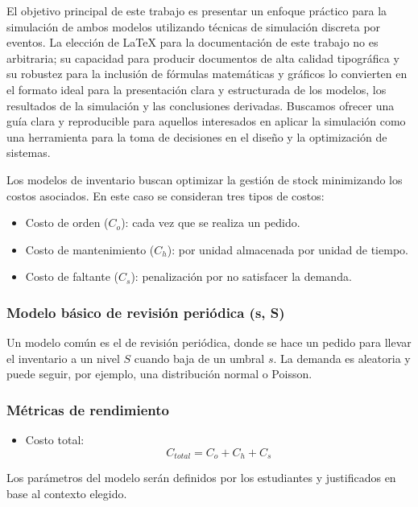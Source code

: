 \documentclass{article}
\begin{document}
El objetivo principal de este trabajo es presentar un enfoque práctico para la simulación de ambos modelos utilizando técnicas de simulación discreta por eventos. La elección de LaTeX para la documentación de este trabajo no es arbitraria; su capacidad para producir documentos de alta calidad tipográfica y su robustez para la inclusión de fórmulas matemáticas y gráficos lo convierten en el formato ideal para la presentación clara y estructurada de los modelos, los resultados de la simulación y las conclusiones derivadas. Buscamos ofrecer una guía clara y reproducible para aquellos interesados en aplicar la simulación como una herramienta para la toma de decisiones en el diseño y la optimización de sistemas.

Los modelos de inventario buscan optimizar la gestión de stock minimizando los costos asociados. En este caso se consideran tres tipos de costos:

\begin{itemize}
    \item Costo de orden (\( C_o \)): cada vez que se realiza un pedido.
    \item Costo de mantenimiento (\( C_h \)): por unidad almacenada por unidad de tiempo.
    \item Costo de faltante (\( C_s \)): penalización por no satisfacer la demanda.
\end{itemize}

\subsubsection*{Modelo básico de revisión periódica (s, S)}

Un modelo común es el de revisión periódica, donde se hace un pedido para llevar el inventario a un nivel \( S \) cuando baja de un umbral \( s \). La demanda es aleatoria y puede seguir, por ejemplo, una distribución normal o Poisson.

\subsubsection*{Métricas de rendimiento}

\begin{itemize}
    \item Costo total: 
    \[
        C_{total} = C_o + C_h + C_s
    \]
\end{itemize}

Los parámetros del modelo serán definidos por los estudiantes y justificados en base al contexto elegido.
\end{document}
